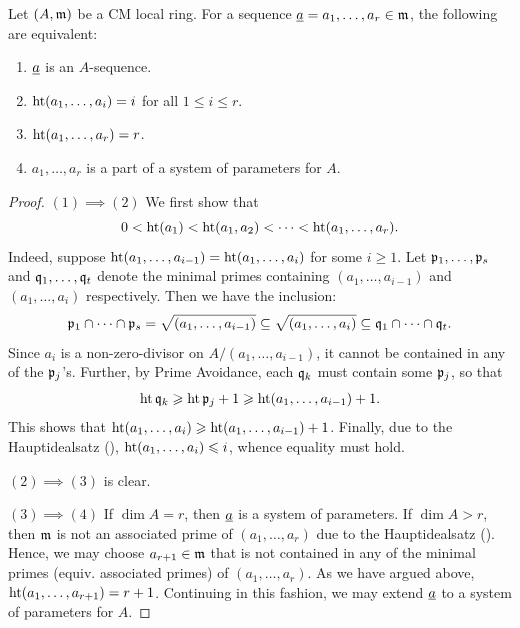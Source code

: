 \begin{theorem}
    Let $(A,\mathfrak{m})$ be a CM local ring. For a sequence $\underline{a} = a_1,\dots,a_r\in\mathfrak{m}$, the following are equivalent: 
    \begin{enumerate}[label=(\arabic*)]
        \item $\underline{a}$ is an $A$-sequence. 
        \item $\operatorname{ht} (a_1,\dots,a_i) = i$ for all $1\le i\le r$.
        \item $\operatorname{ht}(a_1,\dots,a_r) = r$.
        \item $a_1,\dots,a_r$ is a part of a system of parameters for $A$.
    \end{enumerate}
\end{theorem}
\begin{proof}
    $(1)\implies(2)$ We first show that 
    \begin{equation*}
        0 < \operatorname{ht} (a_1) < \operatorname{ht} (a_1, a_2) < \dots < \operatorname{ht} (a_1,\dots,a_r).
    \end{equation*}
    Indeed, suppose $\operatorname{ht} (a_1,\dots,a_{i - 1}) = \operatorname{ht} (a_1,\dots,a_i)$ for some $i\ge 1$. Let $\mathfrak{p}_1,\dots,\mathfrak{p}_s$ and $\mathfrak{q}_1,\dots,\mathfrak{q}_t$ denote the minimal primes containing $(a_1,\dots,a_{i - 1})$ and $(a_1,\dots,a_i)$ respectively. Then we have the inclusion: 
    \begin{equation*}
        \mathfrak{p}_1\cap\dots\cap\mathfrak{p}_s = \sqrt{(a_1,\dots,a_{i - 1})}\subseteq\sqrt{(a_1,\dots,a_i)}\subseteq\mathfrak{q}_1\cap\dots\cap\mathfrak{q}_t.
    \end{equation*}
    Since $a_i$ is a non-zero-divisor on $A/(a_1,\dots,a_{i - 1})$, it cannot be contained in any of the $\mathfrak{p}_j$'s. Further, by Prime Avoidance, each $\mathfrak{q}_k$ must contain some $\mathfrak{p}_j$, so that 
    \begin{equation*}
        \operatorname{ht}\mathfrak{q}_k\geqslant\operatorname{ht}\mathfrak{p}_j + 1\geqslant\operatorname{ht} (a_1,\dots,a_{i - 1}) + 1.
    \end{equation*}
    This shows that $\operatorname{ht} (a_1,\dots,a_i)\geqslant\operatorname{ht} (a_1,\dots,a_{i - 1}) + 1$. Finally, due to the Hauptidealsatz (), $\operatorname{ht} (a_1,\dots,a_i)\leqslant i$, whence equality must hold.

    $(2)\implies(3)$ is clear. 

    $(3)\implies(4)$ If $\dim A = r$, then $\underline{a}$ is a system of parameters. If $\dim A > r$, then $\mathfrak{m}$ is not an associated prime of $(a_1,\dots,a_r)$ due to the Hauptidealsatz (). Hence, we may choose $a_{r + 1}\in\mathfrak{m}$ that is not contained in any of the minimal primes (equiv. associated primes) of $(a_1,\dots,a_r)$. As we have argued above, $\operatorname{ht}(a_1,\dots,a_{r + 1}) = r + 1$. Continuing in this fashion, we may extend $\underline{a}$ to a system of parameters for $A$. 


\end{proof}
